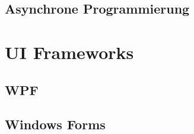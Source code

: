 \subsection{Asynchrone Programmierung}
\label{subsec:async}

\section{UI Frameworks}
\label{sec:ui_frameworks}

\subsection{WPF}
\label{subsec:WPF}

\subsection{Windows Forms}
\label{subsec:Winforms}


